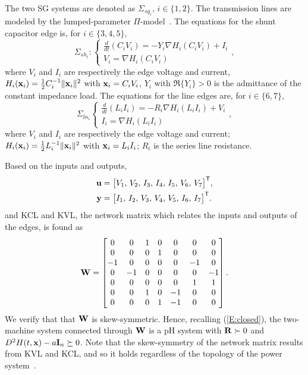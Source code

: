The two SG systems are denoted as $\Sigma_{sg_i},\, i \in \{1, 2\}$. The transmission lines are modeled by the lumped-parameter $\Pi$-model~\cite{watson2021scalable}. The equations for the shunt capacitor edge is, for $i \in \{3, 4, 5\}$,
\begin{equation} \label{E:capacitor}
    \Sigma_{sh_i}: \begin{cases}
        \frac{d}{dt} (C_i V_i) = -Y_i \nabla H_i(C_i V_i) + I_i \\
        V_i = \nabla H_i(C_i V_i)
    \end{cases},
\end{equation}
where $V_i$ and $I_i$ are respectively the edge voltage and current,
$H_i(\mathbf{x}_i) = \frac{1}{2} C_i^{-1} \|\mathbf{x}_i\|^2$ with $\mathbf{x}_i = C_i V_i$, $Y_i$ with $\Re\{Y_i\} > 0$ is the admittance of the constant impedance load. The equations for the line edges are, for $i \in \{6, 7\}$,
\begin{equation} \label{E:inductor}
    \Sigma_{ln_i} \begin{cases}
        \frac{d}{dt} (L_i I_i) = -R_i \nabla H_i(L_i I_i) + V_i \\
        I_i = \nabla H_i(L_i I_i)
    \end{cases},
\end{equation}
where $V_i$ and $I_i$ are respectively the edge voltage and current; 
$H_i(\mathbf{x}_i) = \frac{1}{2} L_i^{-1} \|\mathbf{x}_i\|^2$ with $\mathbf{x}_i = L_i I_i$; $R_i$ is the series line resistance.

Based on the inputs and outputs,
\begin{align*}
    \mathbf{u} &= \big[ V_1,\, V_2,\, I_3,\, I_4,\, I_5,\, V_6,\, V_7 \big]^{\mathsf{T}}, \\
    \mathbf{y} &= \big[ I_1,\, I_2,\, V_3,\, V_4,\, V_5,\, I_6,\, I_7 \big]^{\mathsf{T}}.
\end{align*}
and KCL and KVL, the network matrix which relates the inputs and outputs of the edges, is found as
\begin{equation*}
    \mathbf{W} = \begin{bmatrix}
        0 &0 &1 &0 &0 &0 &0 \\
        0 &0 &0 &1 &0 &0 &0 \\
        -1 &0 &0 &0 &0 &-1 &0 \\
        0 &-1 &0 &0 &0 &0 &-1 \\
        0 &0 &0 &0 &0 &1 &1 \\
        0 &0 &1 &0 &-1 &0 &0 \\
        0 &0 &0 &1 &-1 &0 &0
    \end{bmatrix}.
\end{equation*}
We verify that that $\mathbf{W}$ is skew-symmetric. 
Hence, recalling (\ref{E:closed}), the two-machine system connected through $\mathbf{W}$ is a pH system with $\mathbf{R} \succ 0$ and $D^2 H(t, \mathbf{x}) - a\mathbf{I}_n \succeq 0$. Note that the skew-symmetry of the network matrix results from KVL and KCL, and so it holds regardless of the topology of the power system~\cite{jiang2024reference}.

